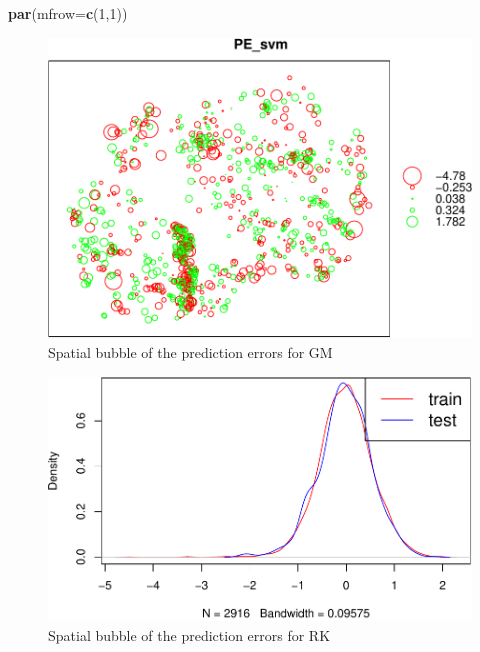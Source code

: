 \documentclass[10pt,b5paper,]{book}
\newenvironment{Shaded}{\begin{snugshade}}{\end{snugshade}}
\newcommand{\CommentTok}[1]{\textcolor[rgb]{0.56,0.35,0.01}{\textit{#1}}}
\newcommand{\DataTypeTok}[1]{\textcolor[rgb]{0.13,0.29,0.53}{#1}}
\newcommand{\DecValTok}[1]{\textcolor[rgb]{0.00,0.00,0.81}{#1}}
\newcommand{\KeywordTok}[1]{\textcolor[rgb]{0.13,0.29,0.53}{\textbf{#1}}}
\newcommand{\NormalTok}[1]{#1}
\newcommand{\OperatorTok}[1]{\textcolor[rgb]{0.81,0.36,0.00}{\textbf{#1}}}
\newcommand{\StringTok}[1]{\textcolor[rgb]{0.31,0.60,0.02}{#1}}
\theoremstyle{definition}
\theoremstyle{definition}
\theoremstyle{definition}
\theoremstyle{remark}
\begin{document}
\begin{Shaded}
\begin{Highlighting}[]
\KeywordTok{par}\NormalTok{(}\DataTypeTok{mfrow=}\KeywordTok{c}\NormalTok{(}\DecValTok{1}\NormalTok{,}\DecValTok{1}\NormalTok{))}
\end{Highlighting}
\end{Shaded}

\begin{Shaded}
\end{Shaded}

\begin{figure}
\includegraphics[width=0.6\linewidth]{SOCMapping_files/figure-latex/unnamed-chunk-90-1} \caption{Spatial bubble of the prediction errors for GM}\label{fig:unnamed-chunk-90}
\end{figure}

\begin{Shaded}
\end{Shaded}

\begin{figure}
\includegraphics[width=0.6\linewidth]{SOCMapping_files/figure-latex/unnamed-chunk-91-1} \caption{Spatial bubble of the prediction errors for RK}\label{fig:unnamed-chunk-91}
\end{figure}
\end{document}
